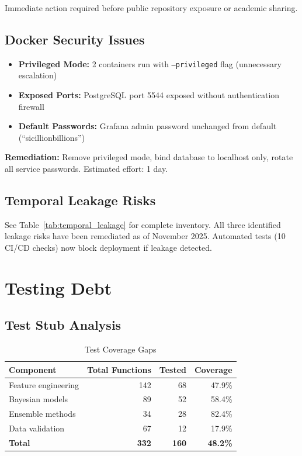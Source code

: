 Immediate action required before public repository exposure or academic sharing.

\subsection{Docker Security Issues}

\begin{itemize}
    \item \textbf{Privileged Mode:} 2 containers run with \texttt{--privileged} flag (unnecessary escalation)
    \item \textbf{Exposed Ports:} PostgreSQL port 5544 exposed without authentication firewall
    \item \textbf{Default Passwords:} Grafana admin password unchanged from default (``sicillionbillions'')
\end{itemize}

\textbf{Remediation:} Remove privileged mode, bind database to localhost only, rotate all service passwords. Estimated effort: 1 day.

\subsection{Temporal Leakage Risks}

See Table~\ref{tab:temporal_leakage} for complete inventory. All three identified leakage risks have been remediated as of November 2025. Automated tests (10 CI/CD checks) now block deployment if leakage detected.

\section{Testing Debt}

\subsection{Test Stub Analysis}

\begin{table}[htbp]
\centering
\caption{Test Coverage Gaps}
\label{tab:test_coverage}
\begin{tabular}{@{}lrrr@{}}
\toprule
\textbf{Component} & \textbf{Total Functions} & \textbf{Tested} & \textbf{Coverage} \\
\midrule
Feature engineering & 142 & 68 & 47.9\% \\
Bayesian models & 89 & 52 & 58.4\% \\
Ensemble methods & 34 & 28 & 82.4\% \\
Data validation & 67 & 12 & 17.9\% \\
\midrule
\textbf{Total} & \textbf{332} & \textbf{160} & \textbf{48.2\%} \\
\bottomrule
\end{tabular}
\end{table}

